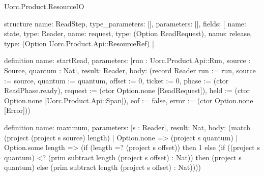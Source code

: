 \begin{lexlean}{Uorc.Product.ResourceIO}
\begin{semanticmodule}
structure{
  name: ReadStep,
  type_parameters: [],
  parameters: [],
  fields: [
    {name: state, type: Reader},
    {name: request, type: (Option ReadRequest)},
    {name: release, type: (Option Uorc.Product.Api::ResourceRef)}
  ]
}

definition{
  name: startRead,
  parameters: [run : Uorc.Product.Api::Run, source : Source, quantum : Nat],
  result: Reader,
  body: (record Reader {run := run, source := source, quantum := quantum, offset := 0, ticket := 0, phase := (ctor ReadPhase.ready), request := (ctor Option.none [ReadRequest]), held := (ctor Option.none [Uorc.Product.Api::Span]), eof := false, error := (ctor Option.none [Error])})
}

definition{
  name: maximum,
  parameters: [s : Reader],
  result: Nat,
  body: (match (project (project s source) length)
    | Option.none => (project s quantum)
    | Option.some length => (if (length =? (project s offset)) then 1 else (if ((project s quantum) <? (prim subtract length (project s offset) : Nat)) then (project s quantum) else (prim subtract length (project s offset) : Nat))))
}


\end{semanticmodule}
\end{lexlean}
